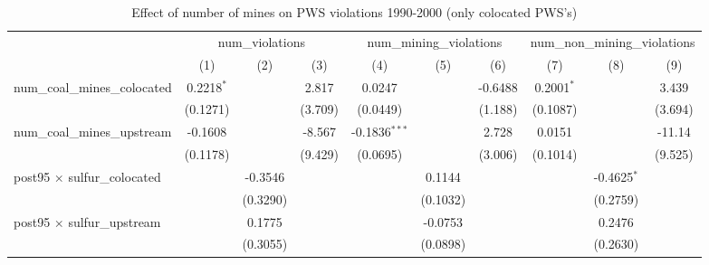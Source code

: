 
\begin{table}[htbp]
   \caption{\label{olsrf2sls_nummine_count_vio_1990to2000colocate} Effect of number of mines on PWS violations 1990-2000 (only colocated PWS's)}
   \bigskip
   \centering
   \begin{adjustbox}{width = \textwidth, center}
      \begin{tabular}{lccccccccc}
         \toprule
          & \multicolumn{3}{c}{num\_violations} & \multicolumn{3}{c}{num\_mining\_violations} & \multicolumn{3}{c}{num\_non\_mining\_violations}\\
                                                            & (1)           & (2)           & (3)           & (4)             & (5)           & (6)           & (7)           & (8)           & (9)\\  
         \midrule 
         num\_coal\_mines\_colocated                        & 0.2218$^{*}$  &               & 2.817         & 0.0247          &               & -0.6488       & 0.2001$^{*}$  &               & 3.439\\   
                                                            & (0.1271)      &               & (3.709)       & (0.0449)        &               & (1.188)       & (0.1087)      &               & (3.694)\\   
         num\_coal\_mines\_upstream                         & -0.1608       &               & -8.567        & -0.1836$^{***}$ &               & 2.728         & 0.0151        &               & -11.14\\   
                                                            & (0.1178)      &               & (9.429)       & (0.0695)        &               & (3.006)       & (0.1014)      &               & (9.525)\\   
         post95 $\times$ sulfur\_colocated                  &               & -0.3546       &               &                 & 0.1144        &               &               & -0.4625$^{*}$ &   \\   
                                                            &               & (0.3290)      &               &                 & (0.1032)      &               &               & (0.2759)      &   \\   
         post95 $\times$ sulfur\_upstream                   &               & 0.1775        &               &                 & -0.0753       &               &               & 0.2476        &   \\   
                                                            &               & (0.3055)      &               &                 & (0.0898)      &               &               & (0.2630)      &   \\   

\end{tabular}
\end{adjustbox}
\end{table}
